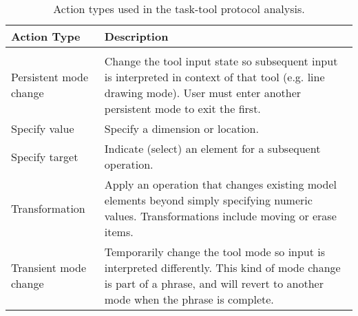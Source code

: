 
\begin{table}%
\centering
\begin{tabular}{l | p{11cm}}
\textbf{Action Type} & \textbf{Description} \\
\hline
&\\

Persistent mode change & 

Change the tool input state so subsequent input is interpreted in
context of that tool (e.g. line drawing mode). User must enter another
persistent mode to exit the first.

\\

Specify value &

Specify a dimension or location.

\\

Specify target &

Indicate (select) an element for a subsequent operation.

\\

Transformation &

Apply an operation that changes existing model elements beyond simply
specifying numeric values. Transformations include moving or erase
items.

\\

Transient mode change &

Temporarily change the tool mode so input is interpreted
differently. This kind of mode change is part of a phrase, and will
revert to another mode when the phrase is complete.

\\
\hline
\end{tabular}
\caption{Action types used in the task-tool protocol analysis.}
\label{tab:task-tool-protocol}
\end{table}
